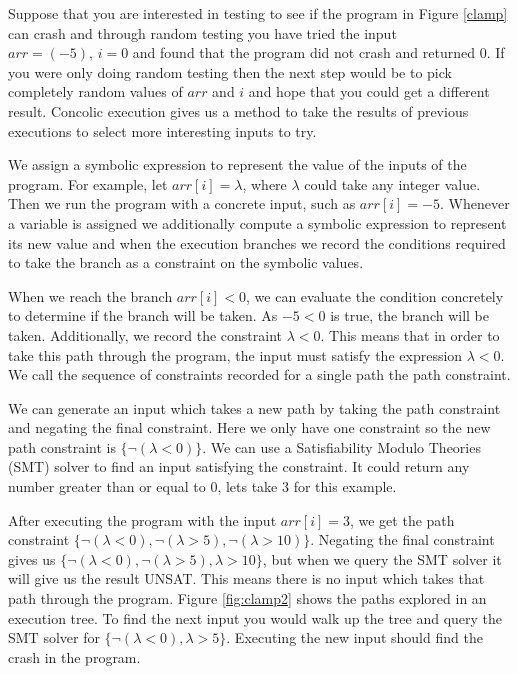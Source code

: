 \documentclass[12pt,twoside]{report}
\begin{document}
Suppose that you are interested in testing to see if the program in Figure \ref{clamp} can crash and through random testing you have tried the input $arr = (-5), \, i = 0$ and found that the program did not crash and returned 0. If you were only doing random testing then the next step would be to pick completely random values of $arr$ and $i$ and hope that you could get a different result. Concolic execution gives us a method to take the results of previous executions to select more interesting inputs to try.

We assign a symbolic expression to represent the value of the inputs of the program. For example, let $arr[i] = \lambda$, where $\lambda$ could take any integer value. Then we run the program with a concrete input, such as $arr[i] = -5$. Whenever a variable is assigned we additionally compute a symbolic expression to represent its new value and when the execution branches we record the conditions required to take the branch as a constraint on the symbolic values.

When we reach the branch $arr[i] < 0$, we can evaluate the condition concretely to determine if the branch will be taken. As $-5 < 0$ is true, the branch will be taken. Additionally, we record the constraint $\lambda < 0$. This means that in order to take this path through the program, the input must satisfy the expression $\lambda < 0$. We call the sequence of constraints recorded for a single path the path constraint.

We can generate an input which takes a new path by taking the path constraint and negating the final constraint. Here we only have one constraint so the new path constraint is $\{\neg(\lambda < 0)\}$. We can use a Satisfiability Modulo Theories (SMT) solver to find an input satisfying the constraint. It could return any number greater than or equal to 0, lets take 3 for this example.

After executing the program with the input $arr[i] = 3$, we get the path constraint $\{\neg(\lambda < 0), \neg(\lambda > 5), \neg(\lambda > 10)\}$. Negating the final constraint gives us $\{\neg(\lambda < 0), \neg(\lambda > 5), \lambda > 10\}$, but when we query the SMT solver it will give us the result UNSAT. This means there is no input which takes that path through the program. Figure \ref{fig:clamp2} shows the paths explored in an execution tree. To find the next input you would walk up the tree and query the SMT solver for $\{\neg(\lambda < 0), \lambda > 5\}$. Executing the new input should find the crash in the program.
\end{document}
